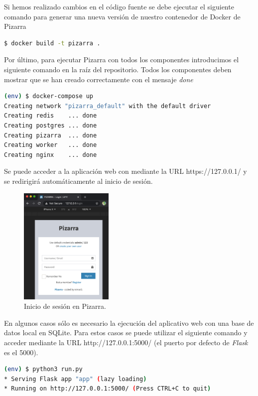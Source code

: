 \documentclass[11pt,spanish,listoffigures,listoftables]{tfgetsinf}
\begin{document}
Si hemos realizado cambios en el código fuente se debe ejecutar el siguiente comando para generar una nueva versión de nuestro \Gls{contenedor} de Docker de Pizarra

\begin{lstlisting}[language=bash]
$ docker build -t pizarra .
\end{lstlisting}

Por último, para ejecutar Pizarra con todos los componentes introducimos el siguiente comando en la raíz del repositorio. Todos los componentes deben mostrar que se han creado correctamente con el mensaje \textit{done}

\begin{lstlisting}[language=bash]
(env) $ docker-compose up
Creating network "pizarra_default" with the default driver
Creating redis    ... done
Creating postgres ... done
Creating pizarra  ... done
Creating worker   ... done
Creating nginx    ... done
\end{lstlisting}

Se puede acceder a la aplicación web con mediante la URL https://127.0.0.1/ y se redirigirá automáticamente al inicio de sesión.

\begin{figure}[ht]
	\centering
	\includegraphics[width=0.40\textwidth]{img/docker-compose-pizarra}
	\caption[Inicio de sesión en Pizarra]{Inicio de sesión en Pizarra.}
	\label{figura:docker-compose-pizarra}
\end{figure}

En algunos casos sólo es necesario la ejecución del aplicativo web con una base de datos local en SQLite. Para estos casos se puede utilizar el siguiente comando y acceder mediante la  URL http://127.0.0.1:5000/ (el puerto por defecto de \textit{Flask} es el 5000).

\begin{lstlisting}[language=bash]
(env) $ python3 run.py 
* Serving Flask app "app" (lazy loading)
* Running on http://127.0.0.1:5000/ (Press CTRL+C to quit)
\end{lstlisting}
\end{document}
